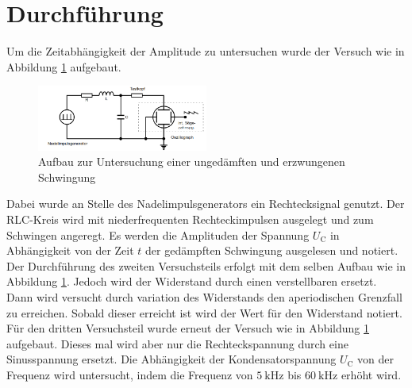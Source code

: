 \section{Durchführung}
\label{sec:Durchführung}
Um die Zeitabhängigkeit der Amplitude zu untersuchen wurde der Versuch wie in Abbildung \ref{fig:aufb a} aufgebaut.
\begin{figure}
    \centering
    \caption{Aufbau zur Untersuchung einer ungedämften und erzwungenen Schwingung \cite{v354}} 
    \label{fig:aufb a}
    \includegraphics[width = 0.5\textwidth]{pics/aufb.png}
\end{figure}
Dabei wurde an Stelle des Nadelimpulsgenerators ein Rechtecksignal genutzt. 
Der RLC-Kreis wird mit niederfrequenten Rechteckimpulsen ausgelegt und zum Schwingen angeregt.
Es werden die Amplituden der Spannung $U_\text{C}$ in Abhängigkeit von der Zeit $t$ der gedämpften Schwingung ausgelesen und notiert.
\\
Der Durchführung des zweiten Versuchsteils erfolgt mit dem selben Aufbau wie in Abbildung \ref{fig:aufb a}.
Jedoch wird der Widerstand durch einen verstellbaren ersetzt. Dann wird versucht durch variation des Widerstands den aperiodischen Grenzfall zu erreichen.
Sobald dieser erreicht ist wird der Wert für den Widerstand notiert.
\\
Für den dritten Versuchsteil wurde erneut der Versuch wie in Abbildung \ref{fig:aufb a} aufgebaut. Dieses mal wird aber nur die Rechteckspannung durch eine Sinusspannung ersetzt.
Die Abhängigkeit der Kondensatorspannung $U_\text{C}$ von der Frequenz wird untersucht, indem die Frequenz von $\SI{5}{\kilo \hertz}$ bis $\SI{60}{\kilo \hertz}$ erhöht wird.

